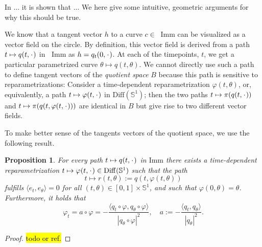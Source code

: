 \message{ !name(tangent_space_of_curves.tex)}\documentclass[a4,danish]{article}
\theoremstyle{break}
\newtheorem{proposition}[subsection]{Proposition}
\theoremstyle{definition}
\theoremstyle{Break}
\newcommand*\I{\mathop{}\!\mathrm{Imm}}
\renewcommand{\S}{\mathbb{S}}
\newcommand{\blank}{\makebox[1ex]{\textbf{$\cdot$}}}
\renewcommand{\phi}{\varphi}
\begin{document}
In ... it is shown that ... We here give some intuitive, geometric
arguments for why this should be true.

We know that a tangent vector $h$ to a curve $c \in \I$ can be visualized
as a vector field on the circle. By definition, this vector field is
derived from a path $t \mapsto q(t,\blank)$ in $\I$ as $h =q_t(0,\blank)$.
At each of the
timepoints, $t$, we get a particular parametrized curve $\theta
\mapsto q(t,\theta)$. We cannot directly use such a path to define
tangent vectors of the \textit{quotient space} $B$ because this path is
sensitive to reparametrizations: Consider a time-dependent
reparametrization $\phi(t,\theta)$, or, equivalently, a path $t \mapsto \phi(t,
\blank)$ in $\text{Diff}(\S^1)$; then the two paths $t \mapsto
\pi(q(t, \blank))$ and $t \mapsto \pi(q(t, \phi(t, \blank)))$ are
identical in $B$ but give rise to two different vector fields.

To make better sense of the tangents vectors of the quotient space, we
use the following result.

\begin{proposition}
  \label{prop:horizontal-path}
  For every path $t \mapsto q(t, \blank)$ in $\mathrm{Imm}$ there exists a
  time-dependent reparametrization $t \mapsto \phi(t, \blank) \in
  \mathrm{Diff}(\S^{1})$ such that the path
  \begin{equation*}
    t \mapsto r(t, \theta):=q(t, \phi(t,\theta))
  \end{equation*}
  fulfills
  $\langle e_t, e_{\theta}\rangle=0$ for all $(t,\theta) \in [0,1]\times \S^1$, and such that $\phi(0, \theta)=\theta$. Furthermore, it holds that 
  \begin{equation}
    \label{eq:canon-repar}
    \phi_t = a \circ \phi
    = -\frac{\langle q_t \circ \phi, q_{\theta} \circ \phi\rangle}{|q_{\theta}\circ \phi|^2},
    \quad a := -\frac{\langle q_t,
      q_{\theta}\rangle}{|q_{\theta}|^2}.
  \end{equation}
\end{proposition}

\begin{proof}
  \hl{todo or ref.}
\end{proof}
\end{document}
